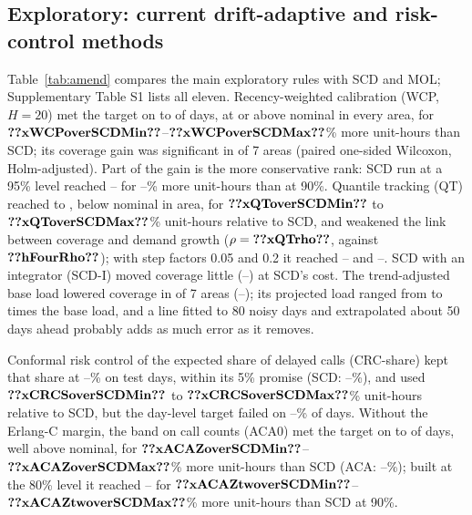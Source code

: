 \documentclass[12pt]{article}
\begin{document}
\subsection{Exploratory: current drift-adaptive and risk-control methods}

Table~\ref{tab:amend} compares the main exploratory rules with SCD and MOL; Supplementary Table S1 lists all eleven. Recency-weighted calibration (WCP, $H=20$) met the target on  to  of days, at or above nominal in every area, for $\res{xWCPoverSCDMin}$--$\res{xWCPoverSCDMax}$\% more unit-hours than SCD; its coverage gain was significant in  of 7 areas (paired one-sided Wilcoxon, Holm-adjusted). Part of the gain is the more conservative rank: SCD run at a 95\% level reached -- for --\% more unit-hours than at 90\%. Quantile tracking (QT) reached  to , below nominal in  area, for $\res{xQToverSCDMin}$ to $\res{xQToverSCDMax}$\% unit-hours relative to SCD, and weakened the link between coverage and demand growth ($\rho=\res{xQTrho}$, against $\res{hFourRho}$); with step factors 0.05 and 0.2 it reached -- and --. SCD with an integrator (SCD-I) moved coverage little (--) at SCD's cost. The trend-adjusted base load lowered coverage in  of 7 areas (--); its projected load ranged from  to  times the base load, and a line fitted to 80 noisy days and extrapolated about 50 days ahead probably adds as much error as it removes.

Conformal risk control of the expected share of delayed calls (CRC-share) kept that share at --\% on test days, within its 5\% promise (SCD: --\%), and used $\res{xCRCSoverSCDMin}$ to $\res{xCRCSoverSCDMax}$\% unit-hours relative to SCD, but the day-level target failed on --\% of days. Without the Erlang-C margin, the band on call counts (ACA0) met the target on  to  of days, well above nominal, for $\res{xACAZoverSCDMin}$--$\res{xACAZoverSCDMax}$\% more unit-hours than SCD (ACA: --\%); built at the 80\% level it reached -- for $\res{xACAZtwoverSCDMin}$--$\res{xACAZtwoverSCDMax}$\% more unit-hours than SCD at 90\%.
\end{document}
